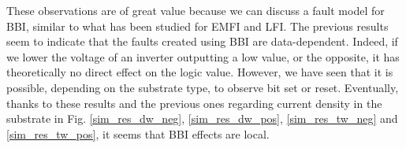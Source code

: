 		These observations are of great value because we can discuss a fault model for BBI, similar to what has been studied for EMFI and LFI.
		The previous results seem to indicate that the faults created using BBI are data-dependent.
		Indeed, if we lower the voltage of an inverter outputting a low value, or the opposite, it has theoretically no direct effect on the logic value.
		However, we have seen that it is possible, depending on the substrate type, to observe bit set or reset.
		Eventually, thanks to these results and the previous ones regarding current density in the substrate in Fig. \ref{sim_res_dw_neg}, \ref{sim_res_dw_pos}, \ref{sim_res_tw_neg} and \ref{sim_res_tw_pos}, it seems that BBI effects are local.

%
%	
%
